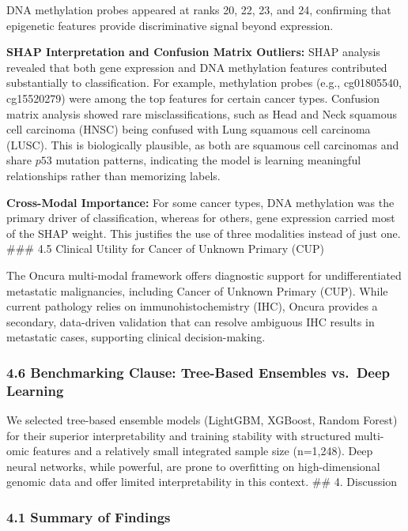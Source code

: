DNA methylation probes appeared at ranks 20, 22, 23, and 24, confirming
that epigenetic features provide discriminative signal beyond
expression.

\textbf{SHAP Interpretation and Confusion Matrix Outliers:} SHAP
analysis revealed that both gene expression and DNA methylation features
contributed substantially to classification. For example, methylation
probes (e.g., cg01805540, cg15520279) were among the top features for
certain cancer types. Confusion matrix analysis showed rare
misclassifications, such as Head and Neck squamous cell carcinoma (HNSC)
being confused with Lung squamous cell carcinoma (LUSC). This is
biologically plausible, as both are squamous cell carcinomas and share
\(p53\) mutation patterns, indicating the model is learning meaningful
relationships rather than memorizing labels.

\textbf{Cross-Modal Importance:} For some cancer types, DNA methylation
was the primary driver of classification, whereas for others, gene
expression carried most of the SHAP weight. This justifies the use of
three modalities instead of just one. \#\#\# 4.5 Clinical Utility for
Cancer of Unknown Primary (CUP)

The Oncura multi-modal framework offers diagnostic support for
undifferentiated metastatic malignancies, including Cancer of Unknown
Primary (CUP). While current pathology relies on immunohistochemistry
(IHC), Oncura provides a secondary, data-driven validation that can
resolve ambiguous IHC results in metastatic cases, supporting clinical
decision-making.

\subsubsection{4.6 Benchmarking Clause: Tree-Based Ensembles vs.~Deep
Learning}\label{benchmarking-clause-tree-based-ensembles-vs.-deep-learning}

We selected tree-based ensemble models (LightGBM, XGBoost, Random
Forest) for their superior interpretability and training stability with
structured multi-omic features and a relatively small integrated sample
size (n=1,248). Deep neural networks, while powerful, are prone to
overfitting on high-dimensional genomic data and offer limited
interpretability in this context. \#\# 4. Discussion

\subsubsection{4.1 Summary of Findings}\label{summary-of-findings}

